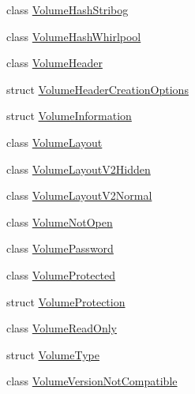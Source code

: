 \begin{DoxyCompactItemize}
\item 
class \hyperlink{class_gost_crypt_1_1_volume_1_1_volume_hash_stribog}{Volume\+Hash\+Stribog}
\item 
class \hyperlink{class_gost_crypt_1_1_volume_1_1_volume_hash_whirlpool}{Volume\+Hash\+Whirlpool}
\item 
class \hyperlink{class_gost_crypt_1_1_volume_1_1_volume_header}{Volume\+Header}
\item 
struct \hyperlink{struct_gost_crypt_1_1_volume_1_1_volume_header_creation_options}{Volume\+Header\+Creation\+Options}
\item 
struct \hyperlink{struct_gost_crypt_1_1_volume_1_1_volume_information}{Volume\+Information}
\item 
class \hyperlink{class_gost_crypt_1_1_volume_1_1_volume_layout}{Volume\+Layout}
\item 
class \hyperlink{class_gost_crypt_1_1_volume_1_1_volume_layout_v2_hidden}{Volume\+Layout\+V2\+Hidden}
\item 
class \hyperlink{class_gost_crypt_1_1_volume_1_1_volume_layout_v2_normal}{Volume\+Layout\+V2\+Normal}
\item 
class \hyperlink{class_gost_crypt_1_1_volume_1_1_volume_not_open}{Volume\+Not\+Open}
\item 
class \hyperlink{class_gost_crypt_1_1_volume_1_1_volume_password}{Volume\+Password}
\item 
class \hyperlink{class_gost_crypt_1_1_volume_1_1_volume_protected}{Volume\+Protected}
\item 
struct \hyperlink{struct_gost_crypt_1_1_volume_1_1_volume_protection}{Volume\+Protection}
\item 
class \hyperlink{class_gost_crypt_1_1_volume_1_1_volume_read_only}{Volume\+Read\+Only}
\item 
struct \hyperlink{struct_gost_crypt_1_1_volume_1_1_volume_type}{Volume\+Type}
\item 
class \hyperlink{class_gost_crypt_1_1_volume_1_1_volume_version_not_compatible}{Volume\+Version\+Not\+Compatible}
\end{DoxyCompactItemize}
